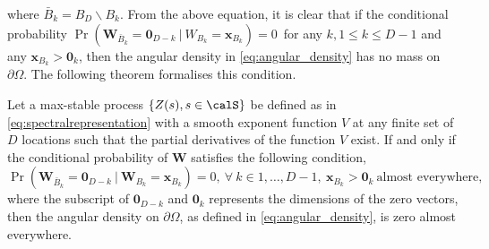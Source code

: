 \documentclass[12pt]{article}
\begin{document}
where $\bar{B}_k = B_D \backslash B_k$.
From the above equation, it is clear that if the conditional probability $\Pr(\bm W_{\bar{B}_k} =\bm 0_{D-k}\ |\ W_{B_k} = \bm x_{B_k} )=0$\ for any $k, 1 \leq k \leq D-1$ and any $\bm x_{B_k} > \bm 0_k$, then the angular density in \eqref{eq:angular_density} has no mass on $\partial\Omega$. The following theorem formalises this condition. 
\begin{theorem}\label{thm:augular_density}
Let a max-stable process $\{Z(s), s\in \calS\}$ be defined as in \eqref{eq:spectralrepresentation} with a smooth exponent function $V$ at any finite set of $D$ locations such that the partial derivatives of the function $V$ exist. If and only if the conditional probability of $\bm W$ satisfies the following condition, 
\begin{equation}\label{eq:thm_angular_density}
\Pr(\bm W_{\bar{B}_k}=\bm 0_{D-k} \ |\ \bm W_{B_k} = \bm x_{B_k} )=0,\ \forall\ k \in {1,\ldots,D-1},\ \bm x_{B_k}>\bm 0_k \ \text{almost everywhere, }
\end{equation}
where the subscript of $\bm 0_{D-k}$ and $\bm 0_{k}$ represents the dimensions of the zero vectors,
then the angular density on $\partial\Omega$, as defined in \eqref{eq:angular_density}, is zero almost everywhere.  
\end{theorem}
\end{document}
